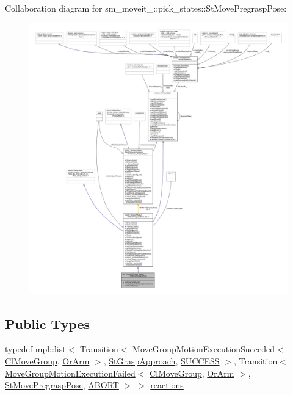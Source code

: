 Collaboration diagram for sm\+\_\+moveit\+\_\+:\+:pick\+\_\+states\+:\+:St\+Move\+Pregrasp\+Pose\+:
\nopagebreak
\begin{figure}[H]
\begin{center}
\leavevmode
\includegraphics[width=350pt]{structsm__moveit__2_1_1pick__states_1_1StMovePregraspPose__coll__graph}
\end{center}
\end{figure}
\subsection*{Public Types}
\begin{DoxyCompactItemize}
\item 
typedef mpl\+::list$<$ Transition$<$ \hyperlink{structmoveit__z__client_1_1MoveGroupMotionExecutionSucceded}{Move\+Group\+Motion\+Execution\+Succeded}$<$ \hyperlink{classmoveit__z__client_1_1ClMoveGroup}{Cl\+Move\+Group}, \hyperlink{classsm__moveit__2_1_1OrArm}{Or\+Arm} $>$, \hyperlink{structsm__moveit__2_1_1pick__states_1_1StGraspApproach}{St\+Grasp\+Approach}, \hyperlink{classSUCCESS}{S\+U\+C\+C\+E\+SS} $>$, Transition$<$ \hyperlink{structmoveit__z__client_1_1MoveGroupMotionExecutionFailed}{Move\+Group\+Motion\+Execution\+Failed}$<$ \hyperlink{classmoveit__z__client_1_1ClMoveGroup}{Cl\+Move\+Group}, \hyperlink{classsm__moveit__2_1_1OrArm}{Or\+Arm} $>$, \hyperlink{structsm__moveit__2_1_1pick__states_1_1StMovePregraspPose}{St\+Move\+Pregrasp\+Pose}, \hyperlink{classABORT}{A\+B\+O\+RT} $>$ $>$ \hyperlink{structsm__moveit__2_1_1pick__states_1_1StMovePregraspPose_a4d0d6e4b695e0c9e14e251d6281d35ed}{reactions}
\end{DoxyCompactItemize}
